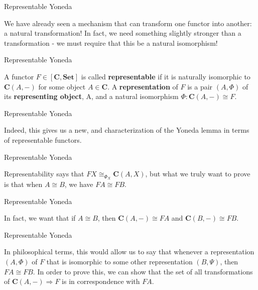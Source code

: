 \documentclass[tikz]{beamer}
\theoremstyle{definition}
\newcommand{\cat}[1]{\mathbf{#1}}
\newcommand{\homf}[2]{[\cat{#1}, \cat{#2}]}
\begin{document}
\begin{frame}{Representable Yoneda}
    
We have already seen a mechanism that can transform one functor into another: a natural transformation! In fact, we need something slightly stronger than a transformation - we must require that this be a natural isomorphism!
\end{frame}

\begin{frame}{Representable Yoneda}
    
\begin{definition}
A functor $F \in \homf{C}{Set}$ is called \textbf{representable} if it is naturally isomorphic to $\cat{C}(A,-)$ for some object $A \in \cat{C}$. A \textbf{representation} of $F$ is a pair $(A, \Phi)$ of its \textbf{representing object}, A, and a natural isomorphism $\Phi : \cat{C}(A,-) \cong F$.

\end{definition}
    
\end{frame}

\begin{frame}{Representable Yoneda}
    
Indeed, this gives us a new, and  characterization of the Yoneda lemma in terms of representable functors. 
    
\end{frame}

\begin{frame}{Representable Yoneda}
    
Representability says that $FX \cong_{\Phi_X} \cat{C}(A,X)$, but what we truly want to prove is that when $ A \cong B$, we have $FA \cong FB$.
    
\end{frame}

\begin{frame}{Representable Yoneda}
    
In fact, we want that if $A \cong B$, then $\cat{C}(A,-) \cong FA$ and  $\cat{C}(B,-) \cong FB$.
    
\end{frame}

\begin{frame}{Representable Yoneda}
    
In philosophical terms, this would allow us to say that whenever a representation $(A, \Phi)$ of $F$ that is isomorphic to some other representation $(B, \Psi)$, then $FA \cong FB$. In order to prove this, we can show that the set of all transformations of $\cat{C}(A,-) \Rightarrow F$ is in correspondence with $FA$.
    
\end{frame}
\end{document}
